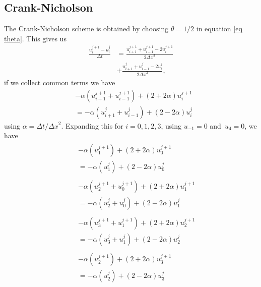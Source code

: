 \documentclass[%
reprint,
nofootinbib,
amsmath,amssymb,
aps,
]{revtex4-1}
\newcommand{\dt}{{\Delta t}}
\newcommand{\dx}{{\Delta x}}
\begin{document}
\subsection{Crank-Nicholson}
The Crank-Nicholson scheme is obtained by choosing $\theta = 1/2$ in equation \ref{eq theta}. 
This gives us 
\begin{equation}
	\begin{split}
			\frac{u_i^{j+1} - u_i^j}{\dt} &= \frac{u_{i+1}^{j+1} + u_{i-1}^{j+1} - 2u_i^{j+1}}{2\dx^2} \\
			&+ \frac{u_{i+1}^{j} + u_{i-1}^{j} - 2u_i^{j}}{2\dx^2},
	\end{split}
\end{equation}
if we collect common terms we have 
\begin{equation}
\begin{split}
		&-\alpha\left(u_{i+1}^{j+1} + u_{i-1}^{j+1}\right) + (2+2\alpha)u_i^{j+1} \\
		&=-\alpha\left(u_{i+1}^{j} + u_{i-1}^{j}\right) + (2-2\alpha)u_i^{j} 
\end{split}
\end{equation}
using $\alpha = \dt /\dx^2$. 
Expanding this for $i = 0,1,2,3$, using $u_{-1} = 0$ and $u_{4} = 0$, we have
\begin{align}
	&\begin{split}
		&-\alpha\left(u_{1}^{j+1}\right) + (2+2\alpha)u_0^{j+1} \\
		&=-\alpha\left(u_{1}^{j}\right) + (2-2\alpha)u_0^{j} 
	\end{split}\\
		&\begin{split}
		&-\alpha\left(u_{2}^{j+1} + u_{0}^{j+1}\right) + (2+2\alpha)u_1^{j+1} \\
		&=-\alpha\left(u_{2}^{j} + u_{0}^{j}\right) + (2-2\alpha)u_1^{j} 
	\end{split}\\
		&\begin{split}
		&-\alpha\left(u_{3}^{j+1} + u_{1}^{j+1}\right) + (2+2\alpha)u_2^{j+1} \\
		&=-\alpha\left(u_{3}^{j} + u_{1}^{j}\right) + (2-2\alpha)u_2^{j} 
	\end{split}\\
		&\begin{split}
		&-\alpha\left(u_{2}^{j+1}\right) + (2+2\alpha)u_3^{j+1} \\
		&=-\alpha\left(u_{2}^{j}\right) + (2-2\alpha)u_3^{j} 
	\end{split}
\end{align}
\end{document}
